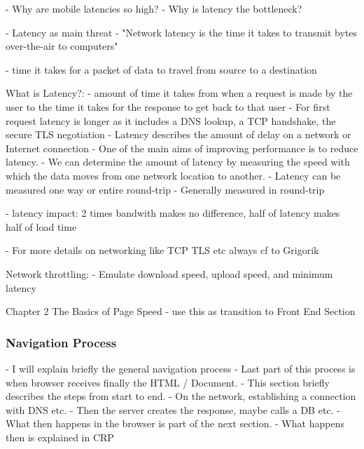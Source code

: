 - Why are mobile latencies so high?
- Why is latency the bottleneck?


- Latency as main threat
- "Network latency is the time it takes to transmit bytes over-the-air to computers"


- time it takes for a packet of data to travel from source to a destination

What is Latency?:
- amount of time it takes from when a request is made by the user to the time it takes for the response to get back to that user
- For first request latency is longer as it includes a DNS lookup, a TCP handshake, the secure TLS negotiation
- Latency describes the amount of delay on a network or Internet connection
- One of the main aims of improving performance is to reduce latency.
- We can determine the amount of latency by measuring the speed with which the data moves from one network location to another.
- Latency can be measured one way or entire round-trip
- Generally measured in round-trip



- latency impact: 2 times bandwith makes no difference, half of latency makes half of load time

- For more details on networking like TCP TLS etc always cf to Grigorik

Network throttling:
- Emulate download speed, upload speed, and minimum latency

Chapter 2 The Basics of Page Speed
- use this as transition to Front End Section



\subsubsection{Navigation Process}

- I will explain briefly the general navigation process
- Last part of this process is when browser receives finally the HTML / Document. 
- This section briefly describes the steps from start to end.
- On the network, establishing a connection with DNS etc.
- Then the server creates the response, maybe calls a DB etc.
- What then happens in the browser is part of the next section.
- What happens then is explained in CRP

